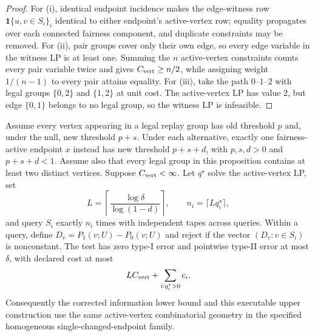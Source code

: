 \begin{proof}
For (i), identical endpoint incidence makes the edge-witness row
$\mathbf 1\{u,v\in S_i\}_i$ identical to either endpoint's active-vertex
row; equality propagates over each connected fairness component, and duplicate
constraints may be removed.  For (ii), pair groups cover only their own edge, so
every edge variable in the witness LP is at least one.  Summing the $n$
active-vertex constraints counts every pair variable twice and gives
$C_{\rm vert}\ge n/2$, while assigning weight $1/(n-1)$ to every pair
attains equality.  For (iii), take the path $0$--$1$--$2$ with legal groups
$\{0,2\}$ and $\{1,2\}$ at unit cost.  The active-vertex LP has value $2$,
but edge $\{0,1\}$ belongs to no legal group, so the witness LP is infeasible.
\end{proof}


\begin{proposition}
\label{prop:p17-active-contrast}
Assume every vertex appearing in a legal replay group has old threshold $p$
and, under the null, new threshold $p+s$.  Under each alternative, exactly one
fairness-active endpoint $x$ instead has new threshold $p+s+d$, with
$p,s,d>0$ and $p+s+d<1$.  Assume also that every legal group in this
proposition contains at least two distinct vertices.  Suppose
$C_{\rm vert}<\infty$.  Let $q^\star$
solve the active-vertex LP, set
\begin{equation}\label{eq:formal-results-047}
L=\left\lceil\frac{\log\delta}{\log(1-d)}\right\rceil,
\qquad
n_i=\lceil Lq_i^\star\rceil,
\end{equation}
and query $S_i$ exactly $n_i$ times with independent tapes across queries.
Within a query, define $D_v=P_1(v;U)-P_0(v;U)$ and reject if the vector
$(D_v:v\in S_i)$ is nonconstant.  The test has zero type-I error and
pointwise type-II error at most $\delta$, with declared cost at most
\begin{equation}\label{eq:formal-results-048}
L C_{\rm vert}+\sum_{i:q_i^\star>0}c_i.
\end{equation}
Consequently the corrected information lower bound and this executable upper
construction use the same active-vertex combinatorial geometry in the specified
homogeneous single-changed-endpoint family.
\end{proposition}

